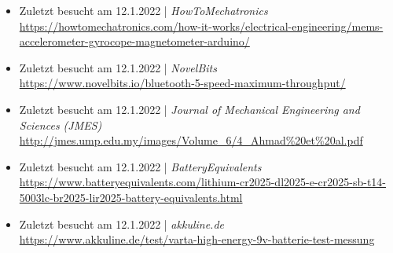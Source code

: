 \begin{itemize}
    \item Zuletzt besucht am 12.1.2022 | \textit{HowToMechatronics}\\
        \url{https://howtomechatronics.com/how-it-works/electrical-engineering/mems-accelerometer-gyrocope-magnetometer-arduino/}
    \item Zuletzt besucht am 12.1.2022 | \textit{NovelBits} \\
        \url{https://www.novelbits.io/bluetooth-5-speed-maximum-throughput/}
    \item Zuletzt besucht am 12.1.2022 | \textit{Journal of Mechanical Engineering and Sciences (JMES)} \\
        \url{http://jmes.ump.edu.my/images/Volume_6/4_Ahmad%20et%20al.pdf}
    \item Zuletzt besucht am 12.1.2022 | \textit{BatteryEquivalents}\\
        \url{https://www.batteryequivalents.com/lithium-cr2025-dl2025-e-cr2025-sb-t14-5003lc-br2025-lir2025-battery-equivalents.html}
    \item Zuletzt besucht am 12.1.2022 | \textit{akkuline.de}\\
        \url{https://www.akkuline.de/test/varta-high-energy-9v-batterie-test-messung}
\end{itemize}